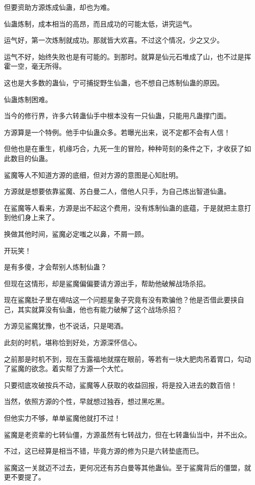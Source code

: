 \begin{this_body}
但要资助方源炼成仙蛊，却也为难。

仙蛊炼制，成本相当的高昂，而且成功的可能太低，讲究运气。

运气好，第一次炼制就成功。那就皆大欢喜。不过这个情况，少之又少。

运气不好，始终失败也是有可能的。到那时。就算是仙元石堆成了山，也不过是挥霍一空，毫无所得。

这也是大多数的蛊仙，宁可捕捉野生仙蛊，也不想自己炼制仙蛊的原因。

仙蛊炼制困难。

当今的修行界，许多六转蛊仙手中根本没有一只仙蛊，只能用凡蛊撑门面。

方源算是一个特例。他手中仙蛊众多。若曝光出来，说不定都不会有人信！

但他也是在重生，机缘巧合，九死一生的冒险，种种苛刻的条件之下，才收获了如此数目的仙蛊。

鲨魔等人不知道方源的底细，但对方源的意图是心知肚明。

方源就是想要依靠鲨魔、苏白曼二人，借他人只手，为自己炼出智道仙蛊。

在鲨魔等人看来，方源是出不起这个费用，没有炼制仙蛊的底蕴，于是就把主意打到他们身上来了。

换做其他时间，鲨魔必定嗤之以鼻，不屑一顾。

开玩笑！

是有多傻，才会帮别人炼制仙蛊？

但现在这情形，却是鲨魔偏偏要请方源出手，帮助他破解战场杀招。

现在鲨魔肚子里在嘀咕这一个问题星象子究竟有没有欺骗他？他是否借此要挟自己，其实就算没有仙蛊，他也有能力破解了这个战场杀招？

方源见鲨魔犹豫，也不说话，只是喝酒。

此刻的时机，堪称恰到好处，方源深怀信心。

之前那是时机不到，现在玉露福地就摆在眼前，等若有一块大肥肉吊着胃口，勾动了鲨魔的欲念。着实帮了方源一个大忙。

只要彻底攻破按兵不动，鲨魔等人获取的收益回报，将是投入进去的数百倍！

当然，依照方源的个性，早就想过独吞，想过黑吃黑。

但他实力不够，单单鲨魔他就打不过！

鲨魔是老资辈的七转仙僵，方源虽然有七转战力，但在七转蛊仙当中，并不出众。

不过，这已经算是相当不错，毕竟方源的修为只是六转垫底而已。

鲨魔这一关就迈不过去，更何况还有苏白曼等其他蛊仙。至于鲨魔背后的僵盟，就更不要提了。


\end{this_body}

